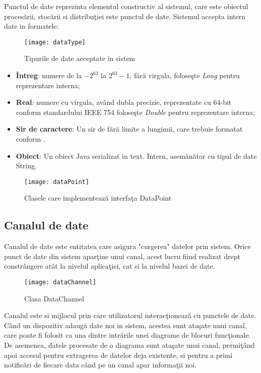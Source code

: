 Punctul de date reprezinta elementul constructiv al sistemul, care este obiectul procesării, stocării si distribuţiei este punctul de date. 
Sistemul accepta intern date in formatele: 
\begin{wrapfigure}{r}{0.38\textwidth}
	\centering
	\texttt{[image: dataType]}
	\caption{Tipurile de date acceptate in sistem}
\end{wrapfigure}
\begin{itemize}
	\item \textbf{Întreg}: numere de la $-2^{63}$ la $2^{63} -1$, fără virgula, foloseşte \textit{Long} pentru reprezentare interna;
	\item \textbf{Real}: numere cu virgula, având dubla precizie, reprezentate cu 64-bit conform standardului \autocite{4610935} IEEE 754  foloseşte \textit{Double} pentru reprezentare interna;
	\item \textbf{Sir de caractere}: Un sir de fără limite a lungimii, care trebuie formatat conform \autocite{rfc4627}. 
	\item \textbf{Obiect}: Un obiect Java serializat in text. Intern, asemănător cu tipul de date String. 
\end{itemize}

\begin{figure}[h]
	\centering
	\texttt{[image: dataPoint]}
	\caption{Clasele care implementează interfaţa DataPoint}
\end{figure}

\subsection{Canalul de date}

Canalul de date este entitatea care asigura "curgerea" datelor prin sistem. Orice punct de date din sistem aparţine unui canal, acest lucru fiind realizat drept constrângere atât la nivelul aplicaţiei, cat si la nivelul bazei de date.
\begin{figure}[h]
	\centering
	\texttt{[image: dataChannel]}
	\caption{Clasa DataChannel}
\end{figure}

Canalul este si mijlocul prin care utilizatorul interacţionează cu punctele de date. Când un dispozitiv adaugă date noi in sistem, acestea sunt ataşate unui canal, care poate fi folosit ca una dintre intrările unei diagrame de blocuri funcţionale. De asemenea, datele procesate de o diagrama sunt ataşate unui canal, permiţând apoi accesul pentru extragerea de datelor deja existente, si pentru a primi notificări de fiecare data când pe un canal apar informaţii noi.

